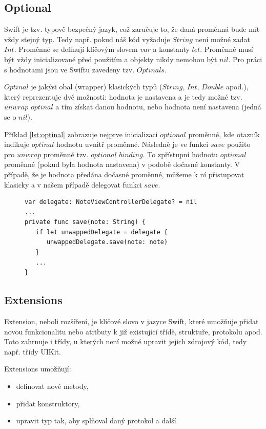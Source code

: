 \documentclass[thesis=M,czech]{FITthesis}[2012/06/26]
\begin{document}
\subsection{Optional}
Swift je tzv. typově bezpečný jazyk, což zaručuje to, že daná proměnná bude mít vždy stejný typ. Tedy např. pokud náš kód vyžaduje $String$ není možné zadat $Int$. 
Proměnné se definují klíčovým slovem $var$ a konstanty $let$. Proměnné musí být vždy inicializované před použitím a objekty nikdy nemohou být $nil$. Pro práci s hodnotami jsou ve Swiftu zavedeny tzv. $Optinals$.

$Optinal$ je jakýsi obal (wrapper) klasických typů ($String$, $Int$, $Double$ apod.), který reprezentuje dvě možnosti: hodnota je nastavena a je tedy možné tzv. $unwrap$ $optinal$ a tím získat danou hodnotu, nebo hodnota není nastavena (jedná se o $nil$). \cite{devBasics}

Příklad \ref{lst:optinal} zobrazuje nejprve inicializaci $optional$ proměnné, kde otazník indikuje $optinal$ hodnotu uvnitř proměnné. Následně je ve funkci $save$ použito pro $unwrap$ proměnné tzv. $optional$ $binding$. To zpřístupní hodnotu $optional$ proměnné (pokud byla hodnota nastavena) v podobě dočasné konstanty. V případě, že je hodnota předána dočasné proměnné, můžeme k ní přistupovat klasicky a v našem případě delegovat funkci $save$.

\begin{figure}
\begin{minipage}{\linewidth}
\begin{lstlisting}[caption={Příklad práce s Optinal},label={lst:optinal}]
var delegate: NoteViewControllerDelegate? = nil
...
private func save(note: String) {
   if let unwappedDelegate = delegate {
      unwappedDelegate.save(note: note)
   }
   ...
}

\end{lstlisting}
\end{minipage}
\end{figure}


\subsection{Extensions}
Extension, neboli rozšíření, je klíčové slovo v jazyce Swift, které umožňuje přidat novou funkcionalitu nebo atributy k již existující třídě, struktuře, protokolu apod. Toto zahrnuje i třídy, u kterých není možné upravit jejich zdrojový kód, tedy např. třídy UIKit.

Extensions umožňují: 
\begin{itemize}
	\item definovat nové metody,
	\item přidat konstruktory, 
	\item upravit typ tak, aby splňoval daný protokol a další. \cite{devExtensions}
\end{itemize}
\end{document}
